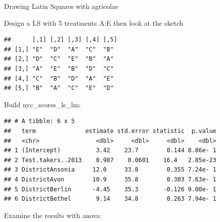 \documentclass[]{book}
\newenvironment{Shaded}{\begin{snugshade}}{\end{snugshade}}
\newcommand{\CommentTok}[1]{\textcolor[rgb]{0.56,0.35,0.01}{\textit{#1}}}
\newcommand{\DataTypeTok}[1]{\textcolor[rgb]{0.13,0.29,0.53}{#1}}
\newcommand{\DecValTok}[1]{\textcolor[rgb]{0.00,0.00,0.81}{#1}}
\newcommand{\KeywordTok}[1]{\textcolor[rgb]{0.13,0.29,0.53}{\textbf{#1}}}
\newcommand{\NormalTok}[1]{#1}
\newcommand{\OperatorTok}[1]{\textcolor[rgb]{0.81,0.36,0.00}{\textbf{#1}}}
\newcommand{\StringTok}[1]{\textcolor[rgb]{0.31,0.60,0.02}{#1}}
\begin{document}
Drawing Latin Squares with agricolae

Design a LS with 5 treatments A:E then look at the sketch

\begin{Shaded}
\end{Shaded}

\begin{verbatim}
##      [,1] [,2] [,3] [,4] [,5]
## [1,] "E"  "D"  "A"  "C"  "B" 
## [2,] "D"  "C"  "E"  "B"  "A" 
## [3,] "A"  "E"  "B"  "D"  "C" 
## [4,] "C"  "B"  "D"  "A"  "E" 
## [5,] "B"  "A"  "C"  "E"  "D"
\end{verbatim}

Build nyc\_scores\_ls\_lm:

\begin{Shaded}
\end{Shaded}

\begin{verbatim}
## # A tibble: 6 x 5
##   term              estimate std.error statistic  p.value
##   <chr>                <dbl>     <dbl>     <dbl>    <dbl>
## 1 (Intercept)          3.42    23.7        0.144 8.86e- 1
## 2 Test.takers..2013    0.987    0.0601    16.4   2.85e-23
## 3 DistrictAnsonia     12.0     33.8        0.355 7.24e- 1
## 4 DistrictAvon        10.9     35.8        0.303 7.63e- 1
## 5 DistrictBerlin      -4.45    35.3       -0.126 9.00e- 1
## 6 DistrictBethel       9.14    34.8        0.263 7.94e- 1
\end{verbatim}

Examine the results with anova:
\end{document}
